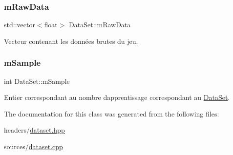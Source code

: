 \subsubsection{\texorpdfstring{m\+Raw\+Data}{mRawData}}
{\footnotesize\ttfamily std\+::vector$<$float$>$ Data\+Set\+::m\+Raw\+Data\hspace{0.3cm}{\ttfamily [private]}}



Vecteur contenant les données brutes du jeu. 

\mbox{\label{classDataSet_a0a2e6525fdc36753382e0546e26198df}} 
\subsubsection{\texorpdfstring{m\+Sample}{mSample}}
{\footnotesize\ttfamily int Data\+Set\+::m\+Sample\hspace{0.3cm}{\ttfamily [private]}}



Entier correspondant au nombre d\textquotesingle{}apprentissage correspondant au \hyperlink{classDataSet}{Data\+Set}. 



The documentation for this class was generated from the following files\+:\begin{DoxyCompactItemize}
\item 
headers/\hyperlink{dataset_8hpp}{dataset.\+hpp}\item 
sources/\hyperlink{dataset_8cpp}{dataset.\+cpp}\end{DoxyCompactItemize}
